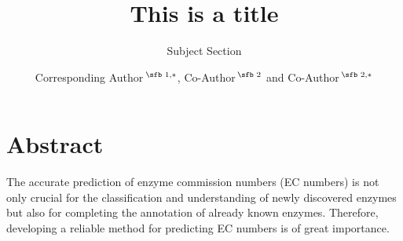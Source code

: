 \documentclass{bioinfo}
\begin{document}

\subtitle{Subject Section}

\title[short Title]{This is a title}
\author[Sample \textit{et~al}.]{Corresponding Author\,$^{\text{\sfb 1,}*}$, Co-Author\,$^{\text{\sfb 2}}$ and Co-Author\,$^{\text{\sfb 2,}*}$}
\address{$^{\text{\sf 1}}$Department, Institution, City, Post Code, Country and \\
$^{\text{\sf 2}}$Department, Institution, City, Post Code,
Country.}





\maketitle

\section{Abstract}

The accurate prediction of enzyme commission numbers (EC numbers) is not only crucial for 
the classification and understanding of newly discovered enzymes but also for completing the annotation of already known enzymes.
Therefore, developing a reliable method for predicting EC numbers is of great importance.
\end{document}
